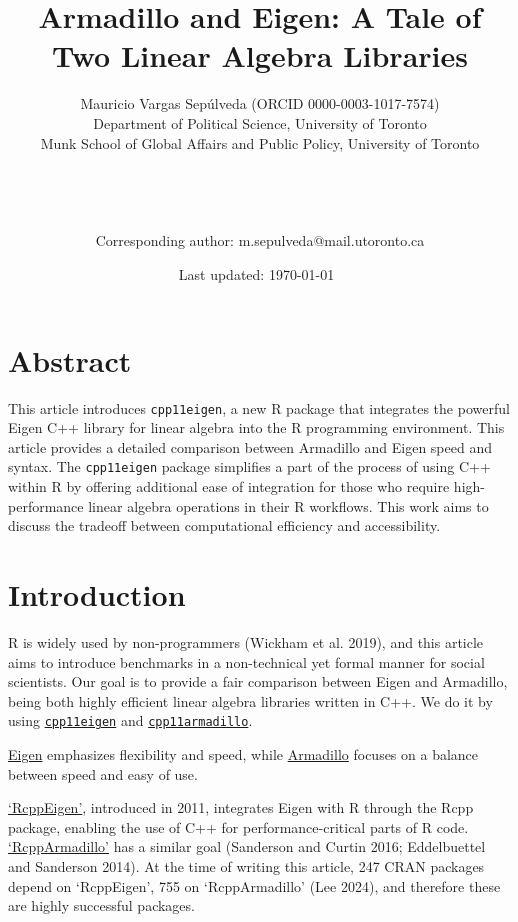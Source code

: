 \documentclass[12pt]{article}
\author{
  Mauricio Vargas Sepúlveda (ORCID 0000-0003-1017-7574)\\Department of
Political Science, University of Toronto\\Munk School of Global Affairs
and Public Policy, University of Toronto\\
  \smallskip\\
  \\\\
  \smallskip\\
  Corresponding author: m.sepulveda@mail.utoronto.ca
}
\title{Armadillo and Eigen: A Tale of Two Linear Algebra Libraries}
\date{Last updated: \today\ \currenttime}
\begin{document}
\maketitle


\thispagestyle{empty}
\tableofcontents
\setcounter{page}{0}
\clearpage

\afterpage{\setlength\parskip{10pt}}

\section{Abstract}\label{abstract}

This article introduces \texttt{cpp11eigen}, a new R package that
integrates the powerful Eigen C++ library for linear algebra into the R
programming environment. This article provides a detailed comparison
between Armadillo and Eigen speed and syntax. The \texttt{cpp11eigen}
package simplifies a part of the process of using C++ within R by
offering additional ease of integration for those who require
high-performance linear algebra operations in their R workflows. This
work aims to discuss the tradeoff between computational efficiency and
accessibility.

\section{Introduction}\label{introduction}

R is widely used by non-programmers (Wickham et al. 2019), and this
article aims to introduce benchmarks in a non-technical yet formal
manner for social scientists. Our goal is to provide a fair comparison
between Eigen and Armadillo, being both highly efficient linear algebra
libraries written in C++. We do it by using
\href{https://pacha.dev/cpp11eigen}{\texttt{cpp11eigen}} and
\href{https://pacha.dev/cpp11armadillo}{\texttt{cpp11armadillo}}.

\href{https://eigen.tuxfamily.org/index.php?title=Main_Page}{Eigen}
emphasizes flexibility and speed, while
\href{http://arma.sourceforge.net/}{Armadillo} focuses on a balance
between speed and easy of use.

\href{https://cran.r-project.org/package=RcppEigen}{`RcppEigen'},
introduced in 2011, integrates Eigen with R through the Rcpp package,
enabling the use of C++ for performance-critical parts of R code.
\href{https://cran.r-project.org/package=RcppArmadillo}{`RcppArmadillo'}
has a similar goal (Sanderson and Curtin 2016; Eddelbuettel and
Sanderson 2014). At the time of writing this article, 247 CRAN packages
depend on `RcppEigen', 755 on `RcppArmadillo' (Lee 2024), and therefore
these are highly successful packages.
\end{document}
